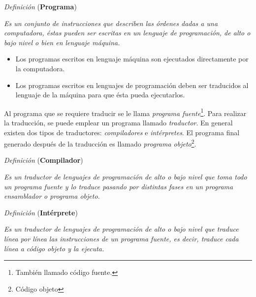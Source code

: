 \documentclass[11pt,spanish]{article}
\begin{document}
\begin{bclogo}[noborder=true, couleurBarre=celestialblue,arrondi =0.1, couleur =anti-flashwhite, logo=\bcplume, marge =10]{\textit{Definición} (\textbf{Programa})}
\vspace{0.25cm}

\emph{Es un conjunto de instrucciones que describen las órdenes dadas
a una computadora, éstas pueden ser escritas en un lenguaje de programación,
de alto o bajo nivel o bien en lenguaje máquina.}

\vspace{0.25cm}       
\end{bclogo}
\begin{itemize}
\item Los programas escritos en lenguaje máquina son ejecutados directamente
por la computadora.
\item Los programas escritos en lenguajes de programación deben ser traducidos
al lenguaje de la máquina para que ésta pueda ejecutarlos.
\end{itemize}
Al programa que se requiere traducir se le llama \emph{programa fuente}\footnote{También llamado código fuente.}.
Para realizar la traducción, se puede emplear un programa llamado
\emph{traductor}. En general existen dos tipos de traductores: \emph{compiladores}
e \emph{intérpretes}. El programa final generado después de la traducción
es llamado \emph{programa objeto}\footnote{Código objeto}.

\begin{bclogo}[noborder=true, couleurBarre=celestialblue,arrondi =0.1, couleur =anti-flashwhite, logo=\bcplume, marge =10]{\textit{Definición} (\textbf{Compilador})}
\vspace{0.25cm}

\emph{Es un traductor de lenguajes de programación de alto o bajo
nivel que toma todo un programa fuente y lo traduce pasando por distintas
fases en un programa ensamblador o programa objeto.}

\vspace{0.25cm}       
\end{bclogo}

\begin{bclogo}[noborder=true, couleurBarre=celestialblue,arrondi =0.1, couleur =anti-flashwhite, logo=\bcplume, marge =10]{\textit{Definición} (\textbf{Intérprete})}
\vspace{0.25cm}

\emph{Es un traductor de lenguajes de programación de alto o bajo
nivel que traduce línea por línea las instrucciones de un programa
fuente, es decir, traduce cada línea a código objeto y la ejecuta.}

\vspace{0.25cm}       
\end{bclogo}
\end{document}

